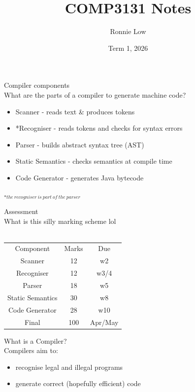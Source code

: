 \documentclass[journal, letterpaper]{IEEEtran}
\title{COMP3131 Notes}
\author{Ronnie Low}
\date{Term 1, 2026}
\begin{document}
\maketitle

\begin{theory}{Compiler components}\\
    What are the parts of a compiler to generate machine code?
    \begin{itemize}
        \item Scanner - reads text \& produces tokens
        \item *Recogniser - reads tokens and checks for syntax errors
        \item Parser - builds abstract syntax tree (AST)
        \item Static Semantics - checks semantics at compile time 
        \item Code Generator - generates Java bytecode
    \end{itemize}
    $_{*the\ recogniser\ is\ part\ of\ the\ parser}$
\end{theory}

\begin{example}{Assessment}\\
    What is this silly marking scheme lol\\
    \\
    \begin{tabular}{ c c c }
        Component & Marks & Due\\
        Scanner & 12 & w2\\
        Recogniser & 12 & w3/4 \\
        Parser & 18 & w5 \\
        Static Semantics & 30 & w8\\
        Code Generator & 28 & w10\\
        Final & 100 & Apr/May\\
    \end{tabular}
\end{example}

\begin{theory}{What is a Compiler?}\\
    Compilers aim to:
    \begin{itemize}
        \item recognise legal and illegal programs
        \item generate correct (hopefully efficient) code
    \end{itemize}
\end{theory}
\end{document}
